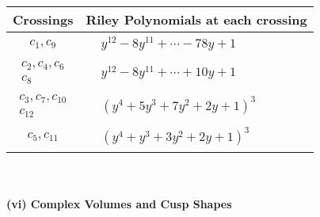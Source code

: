 \documentclass[1p]{elsarticle_modified}
\theoremstyle{definition}
\begin{document}
\begin{tabular}{m{50pt}|m{274pt}}
Crossings & \hspace{64pt}Riley Polynomials at each crossing \\
\hline $$\begin{aligned}c_{1},c_{9}\end{aligned}$$&$\begin{aligned}
&y^{12}-8 y^{11}+\cdots-78 y+1
\end{aligned}$\\
\hline $$\begin{aligned}c_{2},c_{4},c_{6}\\c_{8}\end{aligned}$$&$\begin{aligned}
&y^{12}-8 y^{11}+\cdots+10 y+1
\end{aligned}$\\
\hline $$\begin{aligned}c_{3},c_{7},c_{10}\\c_{12}\end{aligned}$$&$\begin{aligned}
&(y^4+5 y^3+7 y^2+2 y+1)^3
\end{aligned}$\\
\hline $$\begin{aligned}c_{5},c_{11}\end{aligned}$$&$\begin{aligned}
&(y^4+y^3+3 y^2+2 y+1)^3
\end{aligned}$\\
\hline
\end{tabular}\\~\\
\newpage\flushleft \textbf{(vi) Complex Volumes and Cusp Shapes}
\end{document}
